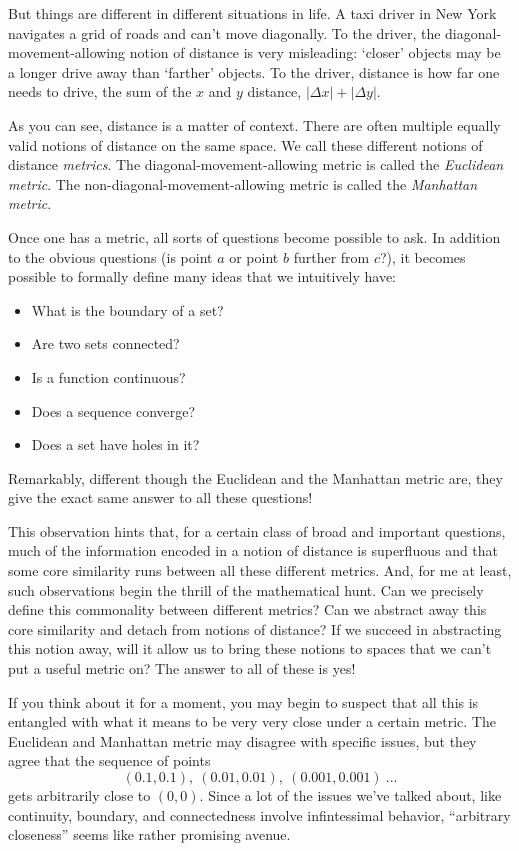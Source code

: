 \documentclass{report}
\begin{document}
But things are different in different situations in life. A taxi driver in New York navigates a grid of roads and can't move diagonally. To the driver, the diagonal-movement-allowing notion of distance is very misleading: `closer' objects may be a longer drive away than `farther' objects. To the driver, distance is how far one needs to drive, the sum of the $x$ and $y$ distance, $|Δx| + |Δy|$.

As you can see, distance is a matter of context. There are often multiple equally valid notions of distance on the same space. We call these different notions of distance \emph{metrics}. The diagonal-movement-allowing metric is called the \emph{Euclidean metric}. The non-diagonal-movement-allowing metric is called the \emph{Manhattan metric}.

Once one has a metric, all sorts of questions become possible to ask. In addition to the obvious questions (is point $a$ or point $b$ further from $c$?), it becomes possible to formally define many ideas that we intuitively have:

\begin{itemize}
\item What is the boundary of a set?
\item Are two sets connected?
\item Is a function continuous?
\item Does a sequence converge?
\item Does a set have holes in it?
\end{itemize}

Remarkably, different though the Euclidean and the Manhattan metric are, they give the exact same answer to all these questions!

This observation hints that, for a certain class of broad and important questions, much of the information encoded in a notion of distance is superfluous and that some core similarity runs between all these different metrics. And, for me at least, such observations begin the thrill of the mathematical hunt. Can we precisely define this commonality between different metrics? Can we abstract away this core similarity and detach from notions of distance? If we succeed in abstracting this notion away, will it allow us to bring these notions to spaces that we can't put a useful metric on? The answer to all of these is yes!

If you think about it for a moment, you may begin to suspect that all this is entangled with what it means to be very very close under a certain metric. The Euclidean and Manhattan metric may disagree with specific issues, but they agree that the sequence of points $$(0.1,0.1), ~ (0.01,0.01), ~ (0.001,0.001) ~...$$ gets arbitrarily close to $(0,0)$. Since a lot of the issues we've talked about, like continuity, boundary, and connectedness involve infintessimal behavior, ``arbitrary closeness'' seems like rather promising avenue.
\end{document}

